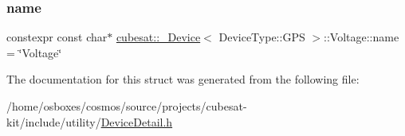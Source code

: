 \subsubsection{\texorpdfstring{name}{name}}
{\footnotesize\ttfamily constexpr const char$\ast$ \hyperlink{structcubesat_1_1__Device}{cubesat\+::\+\_\+\+Device}$<$ Device\+Type\+::\+G\+PS $>$\+::Voltage\+::name = \char`\"{}Voltage\char`\"{}\hspace{0.3cm}{\ttfamily [static]}}



The documentation for this struct was generated from the following file\+:\begin{DoxyCompactItemize}
\item 
/home/osboxes/cosmos/source/projects/cubesat-\/kit/include/utility/\hyperlink{DeviceDetail_8h}{Device\+Detail.\+h}\end{DoxyCompactItemize}
